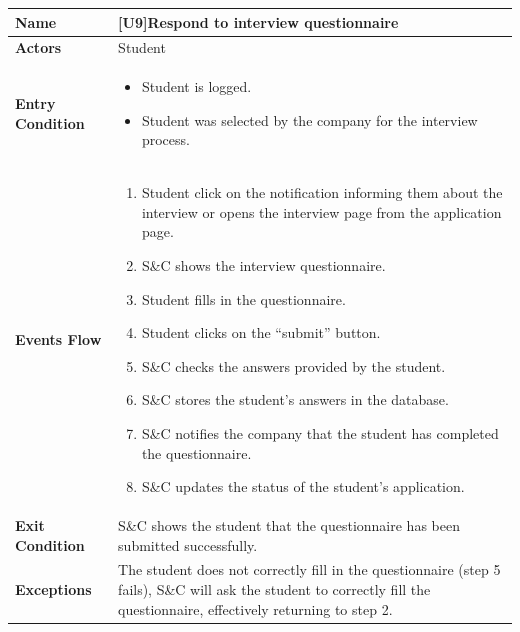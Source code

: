 \begin{center}
    \begin{tabular}{|p{9em}|p{27em}|}
        \hline
        \rowcolor{bluepoli!40} %
        \textbf{Name} & \textbf{[U9]Respond to interview questionnaire} \\
        \hline
        \textbf{Actors} & Student\\
        \hline
        \textbf{Entry Condition} & 
        \begin{itemize}
            \item Student is logged.
            \item Student was selected by the company for the interview process.
        \end{itemize} \\
        \hline
        \textbf{Events Flow} & 
        \begin{enumerate}
            \item Student click on the notification informing them about the interview or opens the interview page from the application page.
            \item S\&C shows the interview questionnaire.
            \item Student fills in the questionnaire.
            \item Student clicks on the ``submit'' button.
            \item S\&C checks the answers provided by the student.
            \item S\&C stores the student's answers in the database.
            \item S\&C notifies the company that the student has completed the questionnaire.
            \item S\&C updates the status of the student's application.
        \end{enumerate} \\
        \hline
        \textbf{Exit Condition} & S\&C shows the student that the questionnaire has been submitted successfully.\\
        \hline
        \textbf{Exceptions} & The student does not correctly fill in the questionnaire (step 5 fails), S\&C will ask the student to correctly
        fill the questionnaire, effectively returning to step 2.\\
        \hline
    \end{tabular}
\end{center}

